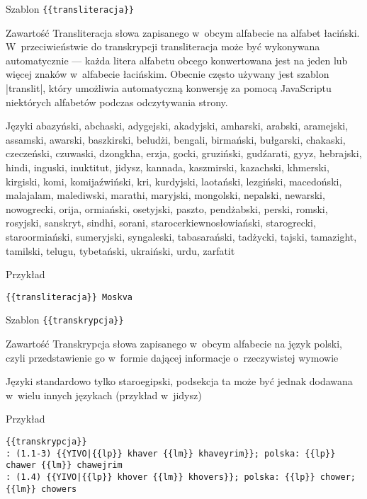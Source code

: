 \begin{opis}
	\item[Szablon] \verb|{{transliteracja}}|
	\item[Zawartość] Transliteracja słowa zapisanego w~obcym alfabecie na alfabet łaciński. \\ W~przeciwieństwie do transkrypcji transliteracja może być wykonywana automatycznie --- każda litera alfabetu obcego konwertowana jest na jeden lub więcej znaków w~alfabecie łacińskim. Obecnie często używany jest szablon \kod|{{translit}}|, który umożliwia automatyczną konwersję za pomocą JavaScriptu niektórych alfabetów podczas odczytywania strony.
	\item[Języki] abazyński, abchaski, adygejski, akadyjski, amharski, arabski, aramejski, assamski, awarski, baszkirski, beludżi, bengali, birmański, bułgarski, chakaski, czeczeński, czuwaski, dzongkha, erzja, gocki, gruziński, gudźarati, gyyz, hebrajski, hindi, inguski, inuktitut, jidysz, kannada, kaszmirski, kazachski, khmerski, kirgiski, komi, komi\dywiz{}jaźwiński, kri, kurdyjski, laotański, lezgiński, macedoński, malajalam, malediwski, marathi, maryjski, mongolski, nepalski, newarski, nowogrecki, orija, ormiański, osetyjski, paszto, pendżabski, perski, romski, rosyjski, sanskryt, sindhi, sorani, staro\dywiz{}cerkiewno\dywiz{}słowiański, starogrecki, staroormiański, sumeryjski, syngaleski, tabasarański, tadżycki, tajski, tamazight, tamilski, telugu, tybetański, ukraiński, urdu, zarfatit
	\item[Przykład]
\begin{lstlisting}
{{transliteracja}} Moskva
\end{lstlisting}
\end{opis}
\spacer
\begin{opis}
	\item[Szablon] \verb|{{transkrypcja}}|
	\item[Zawartość] Transkrypcja słowa zapisanego w~obcym alfabecie na język polski, czyli przedstawienie go w~formie dającej informacje o~rzeczywistej wymowie
	\item[Języki] standardowo tylko staroegipski, podsekcja ta może być jednak dodawana w~wielu innych językach (przykład w~jidysz)
	\item[Przykład]
\begin{lstlisting}
{{transkrypcja}}
: (1.1-3) {{YIVO|{{lp}} khaver {{lm}} khaveyrim}}; polska: {{lp}} chawer {{lm}} chawejrim
: (1.4) {{YIVO|{{lp}} khover {{lm}} khovers}}; polska: {{lp}} chower; {{lm}} chowers
\end{lstlisting}
\end{opis}
